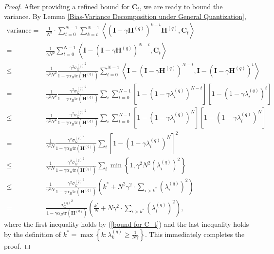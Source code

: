 \documentclass[11pt, letterpaper]{article}
\begin{document}
\begin{proof}
    After providing a refined bound for $\mathbf{C}_t$, we are ready to bound the variance. By Lemma \ref{Bias-Variance Decomposition under General Quantization},
    \begin{equation}
        \label{eq: c31}
        \begin{aligned}
            \mathrm{variance}=&\frac{1}{N^2}\cdot\sum_{t=0}^{N-1}\sum_{k=t}^{N-1}\left\langle(\mathbf{I}-\gamma\mathbf{H}^{(q)})^{k-t}\mathbf{H}^{(q)},\mathbf{C}_t\right\rangle\\
            =&\frac{1}{\gamma N^{2}}\sum_{t=0}^{N-1}\left\langle\mathbf{I}-(\mathbf{I}-\gamma\mathbf{H}^{(q)})^{N-t},\mathbf{C}_{t}\right\rangle\\
            \leq&\frac{1}{\gamma^2 N^{2}}\frac{\gamma^2{\sigma_G^{(q)}}^2}{1-\gamma\alpha_B\mathrm{tr}(\mathbf{H}^{(q)})}\sum_{t=0}^{N-1}\left\langle\mathbf{I}-(\mathbf{I}-\gamma\mathbf{H}^{(q)})^{N-t},\mathbf{I}-(\mathbf{I}-\gamma\mathbf{H}^{(q)})^t\right\rangle\\
            =&\frac{1}{\gamma^2 N^{2}}\frac{\gamma^2{\sigma_G^{(q)}}^2}{1-\gamma\alpha_B\mathrm{tr}(\mathbf{H}^{(q)})}\sum_i\sum_{t=0}^{N-1}\left[1-(1-\gamma\lambda_i^{(q)})^{N-t}\right]\left[1-(1-\gamma\lambda_i^{(q)})^t\right]\\
            \leq&\frac{1}{\gamma^2 N^{2}}\frac{\gamma^2{\sigma_G^{(q)}}^2}{1-\gamma\alpha_B\mathrm{tr}(\mathbf{H}^{(q)})}\sum_i\sum_{t=0}^{N-1}\left[1-(1-\gamma\lambda_i^{(q)})^{N}\right]\left[1-(1-\gamma\lambda_i^{(q)})^N\right]\\
            =&\frac{1}{\gamma^2 N}\frac{\gamma^2{\sigma_G^{(q)}}^2}{1-\gamma\alpha_B\mathrm{tr}(\mathbf{H}^{(q)})}\sum_i\left[1-(1-\gamma\lambda_i^{(q)})^{N}\right]^2\\
            \leq &\frac{1}{\gamma^2 N}\frac{\gamma^2{\sigma_G^{(q)}}^2}{1-\gamma\alpha_B\mathrm{tr}(\mathbf{H}^{(q)})}\sum_i \min\left\{1,\gamma^2 N^2(\lambda_i^{(q)})^2\right\}\\
            \leq &\frac{1}{\gamma^2 N}\frac{\gamma^2{\sigma_G^{(q)}}^2}{1-\gamma\alpha_B\mathrm{tr}(\mathbf{H}^{(q)})}\left(k^*+N^2\gamma^2\cdot\sum_{i>k^*}(\lambda_i^{(q)})^2\right)\\
            =&\frac{{\sigma_G^{(q)}}^2}{1-\gamma\alpha_B\mathrm{tr}(\mathbf{H}^{(q)})}\left(\frac{k^*}{N}+N\gamma^2\cdot\sum_{i>k^*}(\lambda_i^{(q)})^2\right),
        \end{aligned}
    \end{equation}
    where the first inequality holds by (\ref{bound for C_t}) and the last inequality holds by the definition of $k^*=\max\left\{k: \lambda_k^{(q)} \geq \frac{1}{N\gamma}\right\}$. This immediately completes the proof.
\end{proof}
\end{document}

